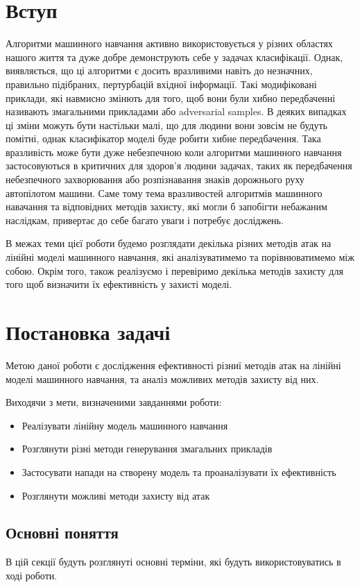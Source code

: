 \documentclass[a4paper,14pt]{extreport}
\begin{document}
	\chapter*{Вступ}
	Алгоритми машинного навчання активно використовується у різних областях нашого життя та дуже добре демонструють себе у задачах класифікації. Однак, виявляється, що ці алгоритми є досить вразливими навіть до незначних, правильно підібраних, пертурбацій вхідної інформації. Такі модифіковані приклади, які навмисно змінють для того, щоб вони були хибно передбаченні називають змагальними прикладами або adversarial samples. В деяких випадках ці зміни можуть бути настільки малі, що для людини вони зовсім не будуть помітні, однак класифікатор моделі буде робити хибне передбачення. Така вразливість може бути дуже небезпечною коли алгоритми машинного навчання застосовуються в критичних для здоров'я людини задачах, таких як передбачення небезпечного захворювання або розпізнавання знаків дорожнього руху автопілотом машини. Саме тому тема вразливостей алгоритмів машинного навачання та відповідних методів захисту, які могли б запобігти небажаним наслідкам, привертає до себе багато уваги і потребує досліджень.
	
	В межах теми цієї роботи будемо розглядати декілька різних методів атак на лінійні моделі машинного навчання, які аналізуватимемо та порівнюватимемо між собою. Окрім того, також реалізуємо і перевіримо декілька методів захисту для того щоб визначити їх ефективність у захисті моделі. 

	\chapter{Постановка задачі} 
	Метою даної роботи є дослідження ефективності різниї методів атак на лінійні моделі машинного навчання, та аналіз можливих методів захисту від них.
	
	Виходячи з мети, визначеними завданнями роботи:
	\begin{itemize}
	\item Реалізувати лінійну модель машинного навчання
	\item Розглянути різні методи генерування змагальних прикладів
	\item Застосувати напади на створену модель та проаналізувати їх ефективність
	\item Розглянути можливі методи захисту від атак
	\end{itemize}
	
	\section{Основні поняття}	
	В цій секції будуть розглянуті основні терміни, які будуть використовуватись в ході роботи.
	
\end{document}
